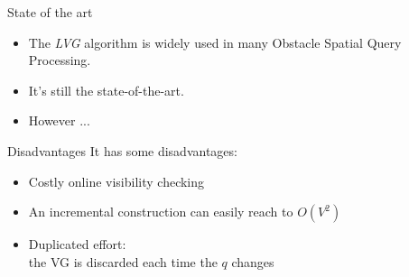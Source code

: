 \begin{frame}{State of the art}
\begin{itemize}
    \item<1-> \small{The \textit{LVG} algorithm is widely used in many Obstacle Spatial Query Processing.}
    \item<2-> \small It's still the state-of-the-art.
    \item<3-> \small However ...
\end{itemize}
\end{frame}

\begin{frame}{Disadvantages}
It has some disadvantages:
\begin{itemize}
    \item \small Costly online visibility checking
    \item \small {An incremental construction can easily reach to $O(V^2)$}
    \item \small {Duplicated effort:\\
    the VG is discarded each time the $q$ changes}
\end{itemize}
\end{frame}
